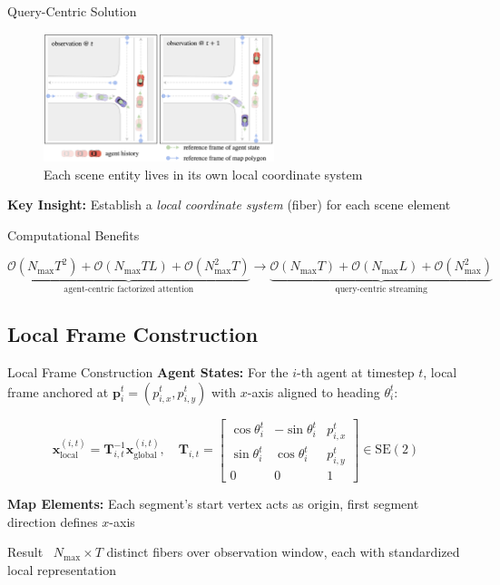 \documentclass[10pt,aspectratio=169]{beamer}
\begin{document}
\begin{frame}{Query-Centric Solution}
\begin{figure}[ht]
\centering
\includegraphics[width=0.6\textwidth]{docs/latex/figures/qc_reference_frame.png}
\caption{Each scene entity lives in its own local coordinate system~\cite{qcnetZhou2023}}
\end{figure}

\textbf{Key Insight:} Establish a \emph{local coordinate system} (fiber) for each scene element~\cite{qcnetZhou2023}

\begin{block}{Computational Benefits~\cite{qcnetZhou2023}}
\begin{center}
\scriptsize
$\underbrace{\mathcal{O}(N_{\max}T^2)+\mathcal{O}(N_{\max}TL)+\mathcal{O}(N_{\max}^2T)}_{\text{agent-centric factorized attention}}
\longrightarrow
\underbrace{\mathcal{O}(N_{\max}T)+\mathcal{O}(N_{\max}L)+\mathcal{O}(N_{\max}^2)}_{\text{query-centric streaming}}$
\end{center}
\end{block}
\end{frame}

\subsection{Local Frame Construction}

\begin{frame}{Local Frame Construction}
\textbf{Agent States:} For the $i$-th agent at timestep $t$, local frame anchored at $\mathbf{p}_i^t = (p_{i,x}^t, p_{i,y}^t)$ with $x$-axis aligned to heading $\theta_i^t$:

\begin{equation}
\mathbf{x}^{(i,t)}_{\text{local}} = \mathbf{T}_{i,t}^{-1} \mathbf{x}_{\text{global}}^{(i,t)}, \quad
\mathbf{T}_{i,t} = \begin{bmatrix}
\cos\theta_i^t & -\sin\theta_i^t & p_{i,x}^t \\
\sin\theta_i^t & \cos\theta_i^t & p_{i,y}^t \\
0 & 0 & 1
\end{bmatrix} \in \mathrm{SE}(2)
\end{equation}

\vspace{0.3cm}

\textbf{Map Elements:} Each segment's start vertex acts as origin, first segment direction defines $x$-axis

\begin{block}{Result~\cite{qcnetZhou2023}}
$N_{\max} \times T$ distinct fibers over observation window, each with standardized local representation
\end{block}
\end{frame}
\end{document}
